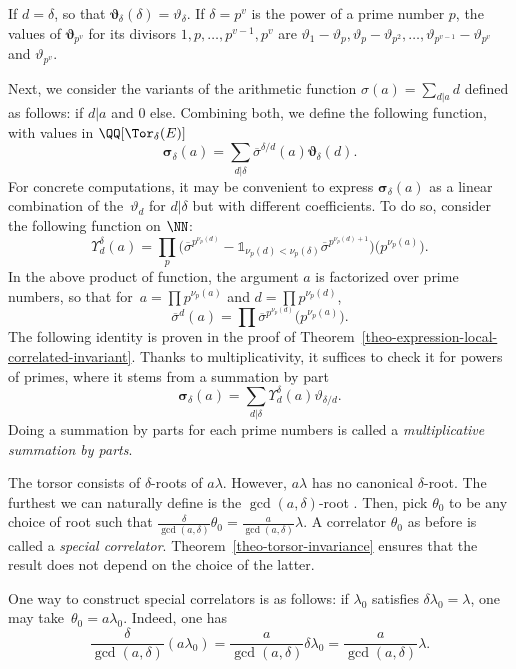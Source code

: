 \begin{expl}
 If $d=\delta$, so that $\boldsymbol{\vartheta}_\delta(\delta) =\vartheta_\delta$. If $\delta=p^v$ is the power of a prime number $p$, the values of $\boldsymbol{\vartheta}_{p^v}$ for its divisors $1,p,\dots,p^{v-1},p^v$ are
 $\vartheta_1-\vartheta_p,\vartheta_p-\vartheta_{p^2},\dots, \vartheta_{p^{v-1}}-\vartheta_{p^v}$ and $\vartheta_{p^v}$.
\end{expl}

Next, we consider the variants of the arithmetic function $\sigma(a)=\sum_{d| a}d$ defined as follows:  if $d|a$ and $0$ else. Combining both, we define the following function, with values in $\QQ[\Tor_\delta(E)]$
\[ \boldsymbol{\sigma}_\delta(a)=\sum_{d|\delta}\overline{\sigma}^{\delta/d}(a)\boldsymbol{\vartheta}_\delta(d). \]
For concrete computations, it may be convenient to express $\boldsymbol{\sigma}_\delta(a)$ as a linear combination of the~$\vartheta_d$ for $d|\delta$ but with different coefficients. To do so, consider the following function on $\NN$:
\[
\Upsilon^\delta_d(a) = \prod_p \bigl(\overline{\sigma}^{p^{\nu_p(d)}}-\mathds{1}_{\nu_p(d)<\nu_p(\delta)}\overline{\sigma}^{p^{\nu_p(d)+1}} \bigr)\bigl(p^{\nu_p(a)}\bigr).
\]
In the above product of function, the argument $a$ is factorized over prime numbers, so that for~$a=\prod p^{\nu_p(a)}$ and $d=\prod p^{\nu_p(d)}$,
\[ \overline{\sigma}^d(a)=\prod\overline{\sigma}^{p^{\nu_p(d)}}\bigl(p^{\nu_p(a)}\bigr). \]
The following identity is proven in the proof of Theorem~\ref{theo-expression-local-correlated-invariant}. Thanks to multiplicativity, it suffices to check it for powers of primes, where it stems from a summation by part
\[ \boldsymbol{\sigma}_\delta(a)=\sum_{d|\delta}\Upsilon_d^\delta(a)\vartheta_{\delta/d}. \]
Doing a summation by parts for each prime numbers is called a \textit{multiplicative summation by parts}.

The torsor consists of $\delta$-roots of $a\lambda$. However, $a\lambda$ has no canonical $\delta$-root. The furthest we can naturally define is the $\gcd(a,\delta)$-root . Then, pick $\theta_0$ to be any choice of root such that $\frac{\delta}{\gcd(a,\delta)}\theta_0 = \frac{a}{\gcd(a,\delta)}\lambda$. A correlator $\theta_0$ as before is called a \textit{special correlator}. Theorem~\ref{theo-torsor-invariance} ensures that the result does not depend on the choice of the latter.

One way to construct special correlators is as follows: if $\lambda_0$ satisfies $\delta\lambda_0=\lambda$, one may take~${\theta_0=a\lambda_0}$. Indeed, one has
\[ \frac{\delta}{\gcd(a,\delta)}(a\lambda_0) = \frac{a}{\gcd(a,\delta)}\delta\lambda_0 = \frac{a}{\gcd(a,\delta)}\lambda. \]

